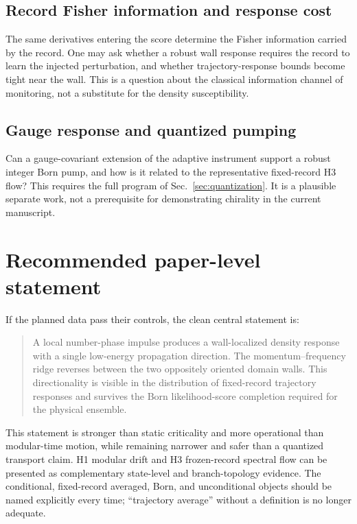 \documentclass[aps,prb,onecolumn,nofootinbib,superscriptaddress]{revtex4-2}
\begin{document}
\subsection{Record Fisher information and response cost}

The same derivatives entering the score determine the Fisher information
carried by the record.  One may ask whether a robust wall response requires the
record to learn the injected perturbation, and whether trajectory-response
bounds \cite{Vu2025} become tight near the wall.  This is a question about the
classical information channel of monitoring, not a substitute for the density
susceptibility.

\subsection{Gauge response and quantized pumping}

Can a gauge-covariant extension of the adaptive instrument support a robust
integer Born pump, and how is it related to the representative fixed-record
H3 flow?  This requires the full program of Sec.~\ref{sec:quantization}.  It is
a plausible separate work, not a prerequisite for demonstrating chirality in
the current manuscript.

\section{Recommended paper-level statement}
\label{sec:recommendation}

If the planned data pass their controls, the clean central statement is:
\begin{quote}
A local number-phase impulse produces a wall-localized density response with a
single low-energy propagation direction.  The momentum--frequency ridge
reverses between the two oppositely oriented domain walls.  This directionality
is visible in the distribution of fixed-record trajectory responses and
survives the Born likelihood-score completion required for the physical
ensemble.
\end{quote}
This statement is stronger than static criticality and more operational than
modular-time motion, while remaining narrower and safer than a quantized
transport claim.  H1 modular drift and H3 frozen-record spectral flow can be
presented as complementary state-level and branch-topology evidence.  The
conditional, fixed-record averaged, Born, and unconditional objects should be
named explicitly every time; ``trajectory average'' without a definition is no
longer adequate.
\end{document}
